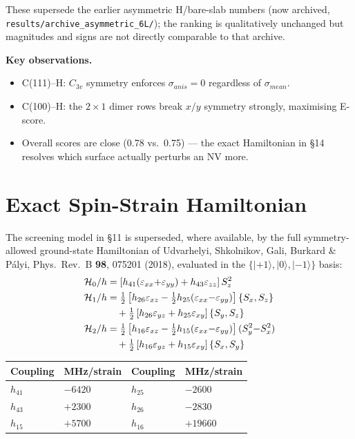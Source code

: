 \documentclass[11pt]{article}
\begin{document}
These supersede the earlier asymmetric H/bare-slab numbers (now archived, \texttt{results/archive\_asymmetric\_6L/}); the ranking is qualitatively unchanged but magnitudes and signs are not directly comparable to that archive.

\textbf{Key observations.}
\begin{itemize}
  \item C(111)--H: $C_{3v}$ symmetry enforces $\sigma_{anis} = 0$ regardless of $\sigma_{mean}$.
  \item C(100)--H: the $2\times1$ dimer rows break $x/y$ symmetry strongly, maximising E-score.
  \item Overall scores are close (0.78 vs.\ 0.75) --- the exact Hamiltonian in \S14 resolves which surface actually perturbs an NV more.
\end{itemize}

\section{Exact Spin-Strain Hamiltonian}

The screening model in \S11 is superseded, where available, by the full symmetry-allowed ground-state Hamiltonian of Udvarhelyi, Shkolnikov, Gali, Burkard \& P\'{a}lyi, Phys.\ Rev.\ B \textbf{98}, 075201 (2018), evaluated in the $\{|{+}1\rangle, |0\rangle, |{-}1\rangle\}$ basis:
\begin{align}
\mathcal{H}_0/h &= \left[h_{41}(\varepsilon_{xx}{+}\varepsilon_{yy}) + h_{43}\varepsilon_{zz}\right] S_z^2 \\
\mathcal{H}_1/h &= \tfrac{1}{2}\left[h_{26}\varepsilon_{xz} - \tfrac{1}{2}h_{25}(\varepsilon_{xx}{-}\varepsilon_{yy})\right]\{S_x,S_z\} \notag\\
&\quad + \tfrac{1}{2}\left[h_{26}\varepsilon_{yz} + h_{25}\varepsilon_{xy}\right]\{S_y,S_z\} \\
\mathcal{H}_2/h &= \tfrac{1}{2}\left[h_{16}\varepsilon_{xz} - \tfrac{1}{2}h_{15}(\varepsilon_{xx}{-}\varepsilon_{yy})\right](S_y^2{-}S_x^2) \notag\\
&\quad + \tfrac{1}{2}\left[h_{16}\varepsilon_{yz} + h_{15}\varepsilon_{xy}\right]\{S_x,S_y\}
\end{align}

\begin{center}
\begin{tabular}{llll}
\toprule
Coupling & MHz/strain & Coupling & MHz/strain \\
\midrule
$h_{41}$ & $-6420$ & $h_{25}$ & $-2600$ \\
$h_{43}$ & $+2300$ & $h_{26}$ & $-2830$ \\
$h_{15}$ & $+5700$ & $h_{16}$ & $+19660$ \\
\bottomrule
\end{tabular}
\end{center}
\end{document}
